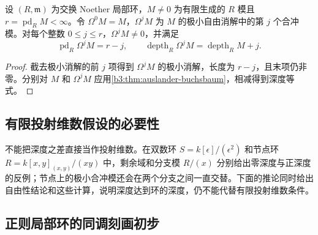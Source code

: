 \begin{corollary}\label{b3:cor:syzygy-depth-finite-pd}
	设 \((R,\mathfrak m)\) 为交换 Noether 局部环，\(M\ne0\) 为有限生成的 \(R\) 模且 \(r=\operatorname{pd}_RM<\infty\)。令 \(\Omega^0M=M\)，\(\Omega^jM\) 为 \(M\) 的极小自由消解中的第 \(j\) 个合冲模。对每个整数 \(0\le j\le r\)，\(\Omega^jM\ne0\)，并满足
	\[
		\operatorname{pd}_R\Omega^jM=r-j,\qquad \operatorname{depth}_R\Omega^jM=\operatorname{depth}_RM+j.
	\]
\end{corollary}
\begin{proof}
	截去极小消解的前 \(j\) 项得到 \(\Omega^jM\) 的极小消解，长度为 \(r-j\)，且末项仍非零。分别对 \(M\) 和 \(\Omega^jM\) 应用\cref{b3:thm:auslander-buchsbaum}，相减得到深度等式。
\end{proof}

\subsection{有限投射维数假设的必要性}
\label{b3:subsec:1704:02}

不能把深度之差直接当作投射维数。在双数环 \(S=k[\epsilon]/(\epsilon^2)\) 和节点环 \(R=k[x,y]_{(x,y)}/(xy)\) 中，剩余域和分支模 \(R/(x)\) 分别给出零深度与正深度的反例；节点上的极小合冲模还会在两个分支之间一直交替。下面的推论同时给出自由性结论和这些计算，说明深度达到环的深度，仍不能代替有限投射维数条件。

\subsection{正则局部环的同调刻画初步}
\label{b3:subsec:1704:03}

